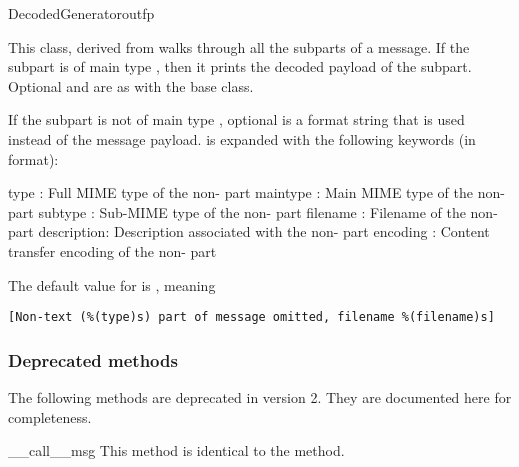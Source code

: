 \begin{classdesc}{DecodedGenerator}{outfp}

This class, derived from  walks through all the
subparts of a message.  If the subpart is of main type
, then it prints the decoded payload of the subpart.
Optional  and  are as with the
 base class.

If the subpart is not of main type , optional 
is a format string that is used instead of the message
payload.   is expanded with the following keywords (in
 format):

type       : Full MIME type of the non- part
maintype   : Main MIME type of the non- part
subtype    : Sub-MIME type of the non- part
filename   : Filename of the non- part
description: Description associated with the non- part
encoding   : Content transfer encoding of the non- part

The default value for  is , meaning

\begin{verbatim}
[Non-text (%(type)s) part of message omitted, filename %(filename)s]
\end{verbatim}

\end{classdesc}

\subsubsection{Deprecated methods}

The following methods are deprecated in  version 2.
They are documented here for completeness.

\begin{methoddesc}[Generator]{__call__}{msg}
This method is identical to the  method.

\end{methoddesc}
